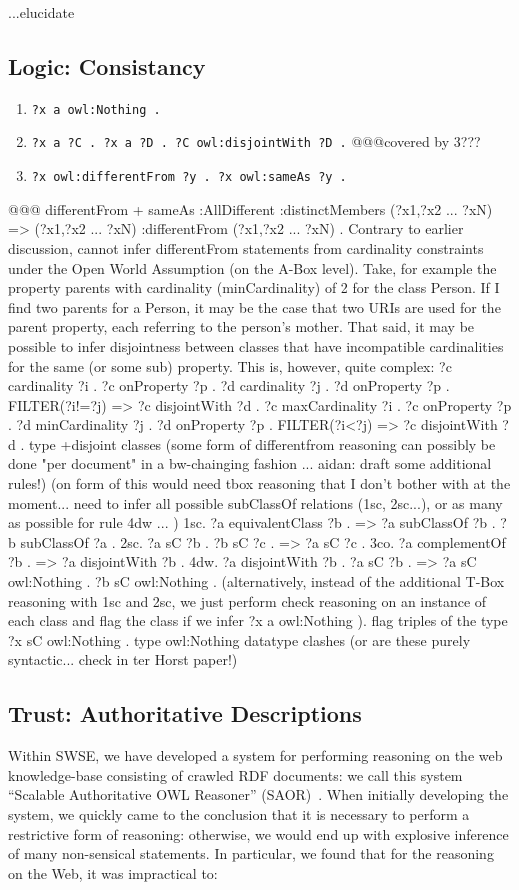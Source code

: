 \documentclass{llncs}
\begin{document}
...elucidate

\subsection{Logic: Consistancy}
\begin{enumerate}
\item {\tt ?x a owl:Nothing .}
\item {\tt ?x a ?C . ?x a ?D . ?C owl:disjointWith ?D .} @@@covered by 3???
\item {\tt ?x owl:differentFrom ?y . ?x owl:sameAs ?y .}
\end{enumerate}

@@@
differentFrom + sameAs 
:AllDifferent :distinctMembers (?x1,?x2 ... ?xN) => (?x1,?x2 ... ?xN) :differentFrom (?x1,?x2 ... ?xN) .
Contrary to earlier discussion, cannot infer differentFrom statements from cardinality constraints under the Open World Assumption (on the A-Box level). Take, for example the property parents with cardinality (minCardinality) of 2 for the class Person. If I find two parents for a Person, it may be the case that two URIs are used for the parent property, each referring to the person's mother.
That said, it may be possible to infer disjointness between classes that have incompatible cardinalities for the same (or some sub) property. This is, however, quite complex: 
?c cardinality ?i . ?c onProperty ?p . ?d cardinality ?j . ?d onProperty ?p . FILTER(?i!=?j) => ?c disjointWith ?d .
?c maxCardinality ?i . ?c onProperty ?p . ?d minCardinality ?j . ?d onProperty ?p . FILTER(?i<?j) => ?c disjointWith ?d .
type +disjoint classes (some form of differentfrom reasoning can possibly be done "per document" in a bw-chainging fashion ... aidan: draft some additional rules!) 
(on form of this would need tbox reasoning that I don't bother with at the moment... need to infer all possible subClassOf relations (1sc, 2sc...), or as many as possible for rule 4dw ...  )
1sc. ?a equivalentClass ?b . => ?a subClassOf ?b . ?b subClassOf ?a .
2sc. ?a sC ?b . ?b sC ?c . => ?a sC ?c .
3co. ?a complementOf ?b . => ?a disjointWith ?b .
4dw. ?a disjointWith ?b . ?a sC ?b . => ?a sC owl:Nothing . ?b sC owl:Nothing .
(alternatively, instead of the additional T-Box reasoning with 1sc and 2sc, we just perform check reasoning on an instance of each class and flag the class if we infer ?x a owl:Nothing ).
flag triples of the type ?x sC owl:Nothing .
type owl:Nothing
datatype clashes (or are these purely syntactic... check in ter Horst paper!) 

\subsection{Trust: Authoritative Descriptions}
Within SWSE, we have developed a system for performing reasoning on the web knowledge-base consisting of crawled RDF documents: we call this system ``Scalable Authoritative OWL Reasoner'' (SAOR)~\cite{key:saoraswc}.
When initially developing the system, we quickly came to the conclusion that it is necessary to perform a restrictive form of reasoning: otherwise, we would end up with explosive inference of many non-sensical statements.
In particular, we found that for the reasoning on the Web, it was impractical to:
\end{document}
